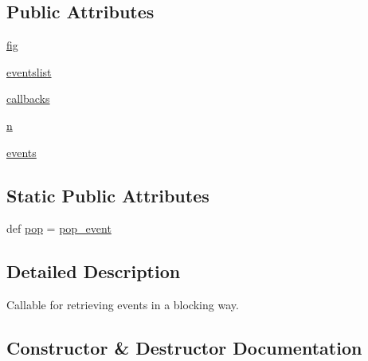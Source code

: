\subsection*{Public Attributes}
\begin{DoxyCompactItemize}
\item 
\hyperlink{classmatplotlib_1_1blocking__input_1_1BlockingInput_aee554aa34b7799bef4ad2406ed6a7e0c}{fig}
\item 
\hyperlink{classmatplotlib_1_1blocking__input_1_1BlockingInput_a3e111b65af4efc37cfe9bcf301cc81a5}{eventslist}
\item 
\hyperlink{classmatplotlib_1_1blocking__input_1_1BlockingInput_a0d6c815d8e7c35134aa236d484ca474e}{callbacks}
\item 
\hyperlink{classmatplotlib_1_1blocking__input_1_1BlockingInput_aa532e64cc6bd2af20bbb5c74a35d84c2}{n}
\item 
\hyperlink{classmatplotlib_1_1blocking__input_1_1BlockingInput_a2d6c8049a767d7b86877b93ea654fd45}{events}
\end{DoxyCompactItemize}
\subsection*{Static Public Attributes}
\begin{DoxyCompactItemize}
\item 
def \hyperlink{classmatplotlib_1_1blocking__input_1_1BlockingInput_a65e969334f4a5cf74f97a3bdb489dae3}{pop} = \hyperlink{classmatplotlib_1_1blocking__input_1_1BlockingInput_a092371bbf637c3d725448bc93b29bb39}{pop\+\_\+event}
\end{DoxyCompactItemize}


\subsection{Detailed Description}
\begin{DoxyVerb}Callable for retrieving events in a blocking way.\end{DoxyVerb}
 

\subsection{Constructor \& Destructor Documentation}
\mbox{\label{classmatplotlib_1_1blocking__input_1_1BlockingInput_a88b11e48cb3625f0ea485b97eba78347}} 
